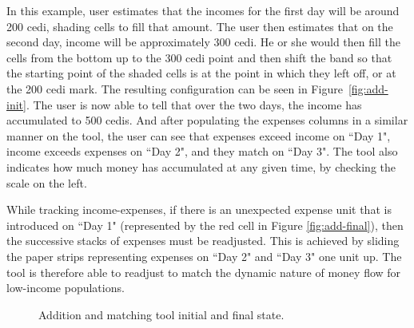 \documentclass{sig-alternate}
\begin{document}
In this example, user estimates that the incomes for the first day will be around 200 cedi, shading cells to fill that amount. The user then estimates that on the second day, income will be approximately 300 cedi. He or she would then fill the cells from the bottom up to the 300 cedi point and then shift the band so that the starting point of the shaded cells is at the point in which they left off, or at the 200 cedi mark. The resulting configuration can be seen in Figure~\ref{fig:add-init}. The user is now able to tell that over the two days, the income has accumulated to 500 cedis. And after populating the expenses columns in a similar manner on the tool, the user can see that expenses exceed income on ``Day 1", income exceeds expenses on ``Day 2", and they match on ``Day 3". The tool also indicates how much money has accumulated at any given time, by checking the scale on the left.
 
While tracking income-expenses, if there is an unexpected expense unit that is introduced on ``Day 1" (represented by the red cell in Figure \ref{fig:add-final}), then the successive stacks of expenses must be readjusted. This is achieved by sliding the paper strips representing expenses on ``Day 2" and ``Day 3" one unit up. The tool is therefore able to readjust to match the dynamic nature of money flow for low-income populations.

\begin{figure}%
    \centering
    \qquad
    \caption{Addition and matching tool initial and final state.}%
    \label{fig:add}%
\end{figure}
\end{document}
